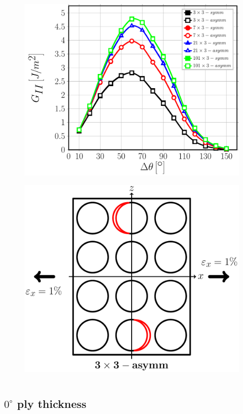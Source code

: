 \documentclass[first,firstsupp,lastsupp,last,hyperref,table]{ETHclass}
\begin{document}
\begin{frame}
\begin{columns}
\begin{column}{0.5\textwidth}
\begin{figure}
\includegraphics[width=\columnwidth]{nxk-coupling-vf60-GII.pdf}
\end{figure}
\vspace{-0.95cm}
\begin{figure}
\centering
\includegraphics[width=0.5\columnwidth]{twofibersbetweendebonds-oppositeside-dtheta80.pdf}
\end{figure}
\end{column}
\end{columns}
\end{frame}

\subsection{$0^{\circ}$ ply thickness}
\end{document}
